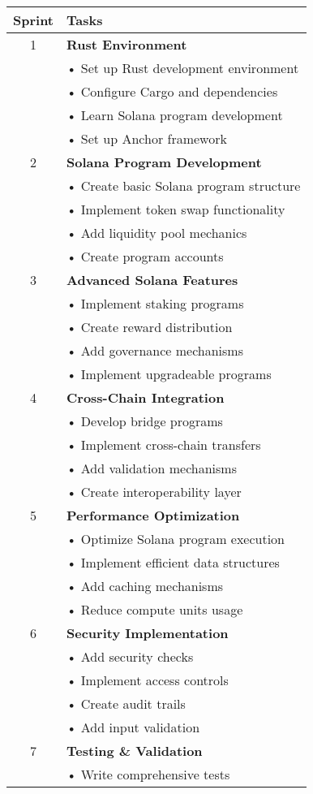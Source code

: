 \documentclass{article}
\begin{document}
\begin{longtable}{|c|p{}|}
\hline
\textbf{Sprint} & \textbf{Tasks} \\
\hline
1 & \textbf{Rust Environment}\\
& • Set up Rust development environment\\
& • Configure Cargo and dependencies\\
& • Learn Solana program development\\
& • Set up Anchor framework\\
\hline
2 & \textbf{Solana Program Development}\\
& • Create basic Solana program structure\\
& • Implement token swap functionality\\
& • Add liquidity pool mechanics\\
& • Create program accounts\\
\hline
3 & \textbf{Advanced Solana Features}\\
& • Implement staking programs\\
& • Create reward distribution\\
& • Add governance mechanisms\\
& • Implement upgradeable programs\\
\hline
4 & \textbf{Cross-Chain Integration}\\
& • Develop bridge programs\\
& • Implement cross-chain transfers\\
& • Add validation mechanisms\\
& • Create interoperability layer\\
\hline
5 & \textbf{Performance Optimization}\\
& • Optimize Solana program execution\\
& • Implement efficient data structures\\
& • Add caching mechanisms\\
& • Reduce compute units usage\\
\hline
6 & \textbf{Security Implementation}\\
& • Add security checks\\
& • Implement access controls\\
& • Create audit trails\\
& • Add input validation\\
\hline
7 & \textbf{Testing \& Validation}\\
& • Write comprehensive tests\\

\end{longtable}
\end{document}
